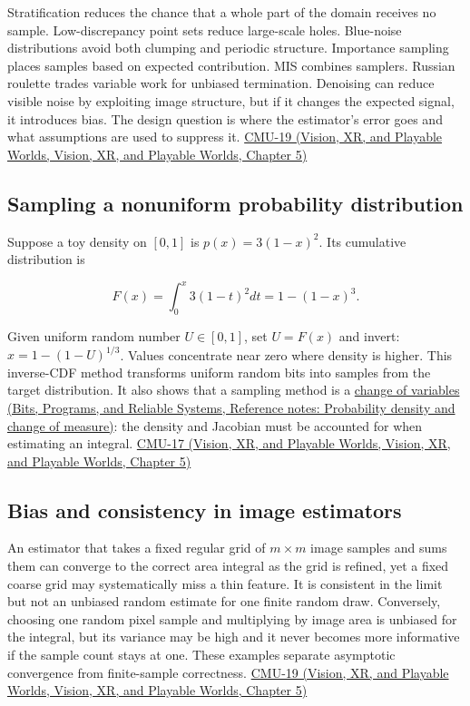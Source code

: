Stratification reduces the chance that a whole part of the domain receives no sample. Low-discrepancy point sets reduce large-scale holes. Blue-noise distributions avoid both clumping and periodic structure. Importance sampling places samples based on expected contribution. MIS combines samplers. Russian roulette trades variable work for unbiased termination. Denoising can reduce visible noise by exploiting image structure, but if it changes the expected signal, it introduces bias. The design question is where the estimator's error goes and what assumptions are used to suppress it. \href{../07-Vision-XR-and-Playable-Worlds/main.pdf\#nameddest=04-visual-computing-ii-ch036-cmu-19---variance-reduction}{CMU-19 (Vision, XR, and Playable Worlds, Vision, XR, and Playable Worlds, Chapter 5)}

\subsection{Sampling a nonuniform probability distribution}\label{03-visual-computing-i-ch012-sampling-a-nonuniform-probability-distribution}

Suppose a toy density on \([0,1]\) is \(p(x)=3(1-x)^2\). Its cumulative distribution is

\[
F(x)=\int_0^x3(1-t)^2dt=1-(1-x)^3.
\]

Given uniform random number \(U\in[0,1]\), set \(U=F(x)\) and invert: \(x=1-(1-U)^{1/3}\). Values concentrate near zero where density is higher. This inverse-CDF method transforms uniform random bits into samples from the target distribution. It also shows that a sampling method is a \href{../01-Bits-Programs-and-Reliable-Systems/main.pdf\#nameddest=appendix-4815cd87ab8b}{change of variables (Bits, Programs, and Reliable Systems, Reference notes: Probability density and change of measure)}: the density and Jacobian must be accounted for when estimating an integral. \href{../07-Vision-XR-and-Playable-Worlds/main.pdf\#nameddest=04-visual-computing-ii-ch036-cmu-17---numerical-integration}{CMU-17 (Vision, XR, and Playable Worlds, Vision, XR, and Playable Worlds, Chapter 5)}

\subsection{Bias and consistency in image estimators}\label{03-visual-computing-i-ch012-bias-and-consistency-in-image-estimators}

An estimator that takes a fixed regular grid of \(m\times m\) image samples and sums them can converge to the correct area integral as the grid is refined, yet a fixed coarse grid may systematically miss a thin feature. It is consistent in the limit but not an unbiased random estimate for one finite random draw. Conversely, choosing one random pixel sample and multiplying by image area is unbiased for the integral, but its variance may be high and it never becomes more informative if the sample count stays at one. These examples separate asymptotic convergence from finite-sample correctness. \href{../07-Vision-XR-and-Playable-Worlds/main.pdf\#nameddest=04-visual-computing-ii-ch036-cmu-19---variance-reduction}{CMU-19 (Vision, XR, and Playable Worlds, Vision, XR, and Playable Worlds, Chapter 5)}

